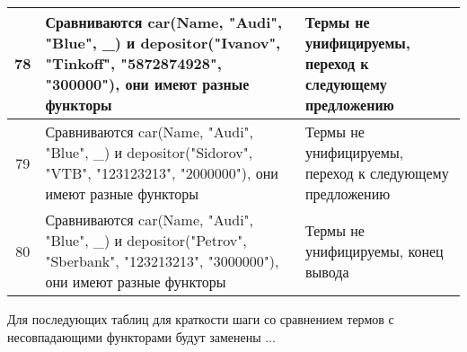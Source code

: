 \documentclass[a4paper,12pt]{article}
\begin{document}
\newpage
\begin{table}[ht!] 
	\begin{tabularx}{\linewidth}{|c|>{\centering}X|>{\centering}X|}
		\hline
		78 & Сравниваются car(Name, "Audi"{}, "Blue"{}, \_) и depositor("Ivanov"{}, "Tinkoff"{}, "5872874928"{}, "300000"), они имеют разные функторы & Термы не унифицируемы, переход к следующему предложению \tabularnewline
		\hline
		79 & Сравниваются car(Name, "Audi"{}, "Blue"{}, \_) и depositor("Sidorov"{}, "VTB"{}, "123123213"{}, "2000000"), они имеют разные функторы & Термы не унифицируемы, переход к следующему предложению \tabularnewline
		\hline
		80 & Сравниваются car(Name, "Audi"{}, "Blue"{}, \_) и depositor("Petrov"{}, "Sberbank"{}, "123213213"{}, "3000000"), они имеют разные функторы & Термы не унифицируемы, конец вывода \tabularnewline
		\hline
	\end{tabularx}
\end{table}

Для последующих таблиц для краткости шаги со сравнением термов с несовпадающими функторами будут заменены $\dots$
\end{document}

